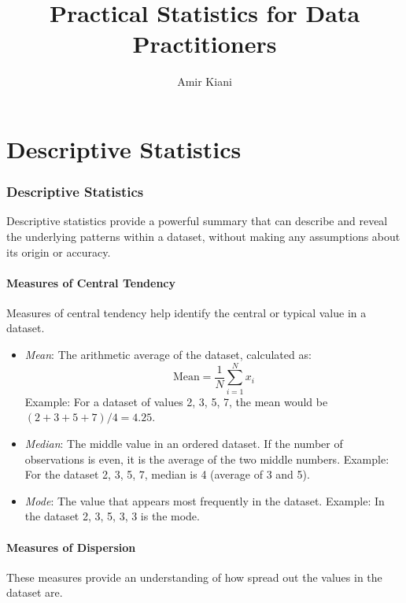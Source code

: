 \documentclass{article}
\title{Practical Statistics for Data Practitioners}
\author{Amir Kiani}
\theoremstyle{definition}
\theoremstyle{theorem}
\theoremstyle{theorem}
\theoremstyle{theorem}
\theoremstyle{theorem}
\theoremstyle{definition}
\theoremstyle{definition}
\theoremstyle{definition}
\theoremstyle{definition}
\theoremstyle{definition}
\begin{document}
\maketitle

\tableofcontents
\newpage

\part{Descriptive Statistics}

\section{Descriptive Statistics}

Descriptive statistics provide a powerful summary that can describe and reveal the underlying patterns within a dataset, without making any assumptions about its origin or accuracy.

\subsection{Measures of Central Tendency}

Measures of central tendency help identify the central or typical value in a dataset.

\begin{itemize}
    \item \textit{Mean}: The arithmetic average of the dataset, calculated as:
    \[
    \text{Mean} = \frac{1}{N} \sum_{i=1}^{N} x_i
    \]
    Example: For a dataset of values 2, 3, 5, 7, the mean would be \((2+3+5+7)/4 = 4.25\).

    \item \textit{Median}: The middle value in an ordered dataset. If the number of observations is even, it is the average of the two middle numbers.
    Example: For the dataset 2, 3, 5, 7, median is 4 (average of 3 and 5).

    \item \textit{Mode}: The value that appears most frequently in the dataset.
    Example: In the dataset 2, 3, 5, 3, 3 is the mode.
\end{itemize}

\subsection{Measures of Dispersion}

These measures provide an understanding of how spread out the values in the dataset are.
\end{document}
